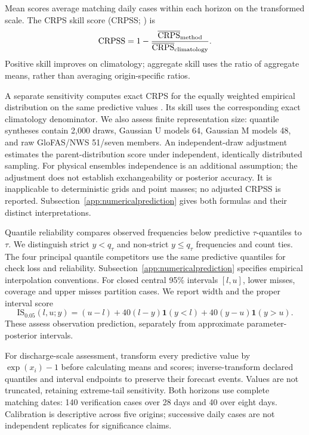 \documentclass[APA,STIX1COL]{WileyNJD-v2}
\begin{document}
Mean scores average matching daily cases within each horizon on the transformed scale. The CRPS skill score (CRPSS; \citealp{wilks2019statistical}) is
\[
\mathrm{CRPSS}=1-\frac{\overline{\mathrm{CRPS}}_{\rm method}}
{\overline{\mathrm{CRPS}}_{\rm climatology}}.
\]
Positive skill improves on climatology; aggregate skill uses the ratio of aggregate means, rather than averaging origin-specific ratios.

A separate sensitivity computes exact CRPS for the equally weighted empirical distribution on the same predictive values \citep{zamo2018crps}. Its skill uses the corresponding exact climatology denominator. We also assess finite representation size: quantile syntheses contain 2,000 draws, Gaussian U models 64, Gaussian M models 48, and raw GloFAS/NWS 51/seven members. An independent-draw adjustment \citep{ferro2014fair} estimates the parent-distribution score under independent, identically distributed sampling. For physical ensembles independence is an additional assumption; the adjustment does not establish exchangeability or posterior accuracy. It is inapplicable to deterministic grids and point masses; no adjusted CRPSS is reported. Subsection~\ref{app:numericalprediction} gives both formulas and their distinct interpretations.

Quantile reliability compares observed frequencies below predictive $\tau$-quantiles to $\tau$. We distinguish strict $y<q_\tau$ and non-strict $y\leq q_\tau$ frequencies and count ties. The four principal quantile competitors use the same predictive quantiles for check loss and reliability. Subsection~\ref{app:numericalprediction} specifies empirical interpolation conventions. For closed central 95\% intervals $[l,u]$, lower misses, coverage and upper misses partition cases. We report width and the proper interval score
\[
\mathrm{IS}_{0.05}(l,u;y)=(u-l)+40(l-y)\mathbf1(y<l)+40(y-u)\mathbf1(y>u).
\]
These assess observation prediction, separately from approximate parameter-posterior intervals.

For discharge-scale assessment, transform every predictive value by $\exp(x_i)-1$ before calculating means and scores; inverse-transform declared quantiles and interval endpoints to preserve their forecast events. Values are not truncated, retaining extreme-tail sensitivity. Both horizons use complete matching dates: 140 verification cases over 28 days and 40 over eight days. Calibration is descriptive across five origins; successive daily cases are not independent replicates for significance claims.
\end{document}
